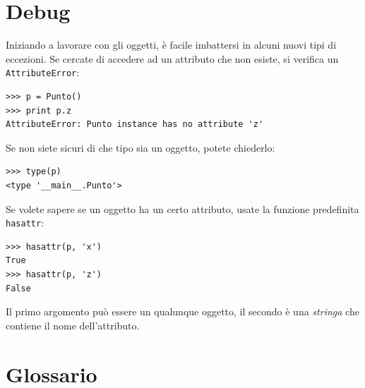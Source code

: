 \documentclass[10pt]{book}
\begin{document}
\section{Debug}
\label{hasattr}

Iniziando a lavorare con gli oggetti, è facile imbattersi in alcuni nuovi tipi di eccezioni. Se cercate di accedere ad un attributo che non esiste, si verifica un {\tt AttributeError}:

\begin{verbatim}
>>> p = Punto()
>>> print p.z
AttributeError: Punto instance has no attribute 'z'
\end{verbatim}
%
Se non siete sicuri di che tipo sia un oggetto, potete chiederlo:

\begin{verbatim}
>>> type(p)
<type '__main__.Punto'>
\end{verbatim}
%
Se volete sapere se un oggetto ha un certo attributo, usate la funzione predefinita {\tt hasattr}:

\begin{verbatim}
>>> hasattr(p, 'x')
True
>>> hasattr(p, 'z')
False
\end{verbatim}
%
Il primo argomento può essere un qualunque oggetto, il secondo è una {\em
stringa} che contiene il nome dell'attributo.


\section{Glossario}
\end{document}
